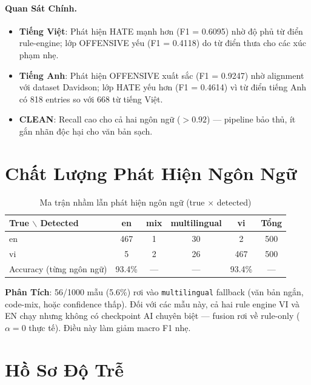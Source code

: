 \documentclass[11pt,a4paper]{article}
\begin{document}
\paragraph{Quan Sát Chính.}
\begin{itemize}
    \item \textbf{Tiếng Việt}: Phát hiện HATE mạnh hơn (F1 = 0.6095) nhờ độ phủ từ điển rule-engine; lớp OFFENSIVE yếu (F1 = 0.4118) do từ điển thưa cho các xúc phạm nhẹ.
    \item \textbf{Tiếng Anh}: Phát hiện OFFENSIVE xuất sắc (F1 = 0.9247) nhờ alignment với dataset Davidson; lớp HATE yếu hơn (F1 = 0.4614) vì từ điển tiếng Anh có 818 entries so với 668 từ tiếng Việt.
    \item \textbf{CLEAN}: Recall cao cho cả hai ngôn ngữ ($>0.92$) --- pipeline bảo thủ, ít gắn nhãn độc hại cho văn bản sạch.
\end{itemize}

\section{Chất Lượng Phát Hiện Ngôn Ngữ}

\begin{table}[H]
    \centering
    \caption{Ma trận nhầm lẫn phát hiện ngôn ngữ (true $\times$ detected)}
    \label{tab:lang_det}
    \begin{tabular}{lccccc}
        \toprule
        True $\backslash$ Detected & en     & mix & multilingual & vi     & Tổng \\
        \midrule
        en                         & 467    & 1   & 30           & 2      & 500  \\
        vi                         & 5      & 2   & 26           & 467    & 500  \\
        \midrule
        Accuracy (từng ngôn ngữ)   & 93.4\% & --- & ---          & 93.4\% & ---  \\
        \bottomrule
    \end{tabular}
\end{table}

\textbf{Phân Tích}: 56/1000 mẫu (5.6\%) rơi vào \texttt{multilingual} fallback (văn bản ngắn, code-mix, hoặc confidence thấp). Đối với các mẫu này, cả hai rule engine VI và EN chạy nhưng không có checkpoint AI chuyên biệt --- fusion rơi về rule-only ($\alpha = 0$ thực tế). Điều này làm giảm macro F1 nhẹ.

\section{Hồ Sơ Độ Trễ}
\label{sec:latency}
\end{document}
